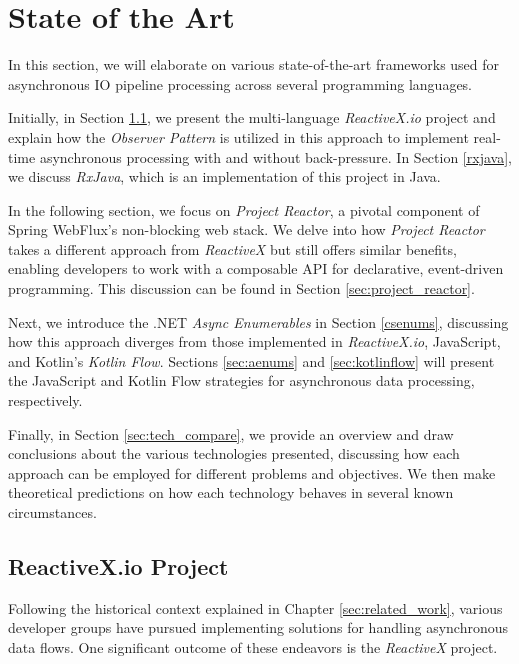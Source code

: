 	
\section{State of the Art} %
\label{sec:state_of_the_art}

In this section, we will elaborate on various state-of-the-art frameworks used for asynchronous IO pipeline processing across several programming languages.

Initially, in Section \ref{reactivex}, we present the multi-language \textit{ReactiveX.io} project and explain how the \textit{Observer Pattern} is utilized in this approach to implement real-time asynchronous processing with and without back-pressure. In Section \ref{rxjava}, we discuss \textit{RxJava}, which is an implementation of this project in Java.

In the following section, we focus on \textit{Project Reactor}, a pivotal component of Spring WebFlux's non-blocking web stack. We delve into how \textit{Project Reactor} takes a different approach from \textit{ReactiveX} but still offers similar benefits, enabling developers to work with a composable API for declarative, event-driven programming. This discussion can be found in Section \ref{sec:project_reactor}.

Next, we introduce the .NET \textit{Async Enumerables} in Section \ref{csenums}, discussing how this approach diverges from those implemented in \textit{ReactiveX.io}, JavaScript, and Kotlin's \textit{Kotlin Flow}. Sections \ref{sec:aenums} and \ref{sec:kotlinflow} will present the JavaScript and Kotlin Flow strategies for asynchronous data processing, respectively.

Finally, in Section \ref{sec:tech_compare}, we provide an overview and draw conclusions about the various technologies presented, discussing how each approach can be employed for different problems and objectives. We then make theoretical predictions on how each technology behaves in several known circumstances.

\subsection{ReactiveX.io Project}
\label{reactivex}

Following the historical context explained in Chapter \ref{sec:related_work}, various developer groups have pursued implementing solutions for handling asynchronous data flows. One significant outcome of these endeavors is the \textit{ReactiveX} project.


